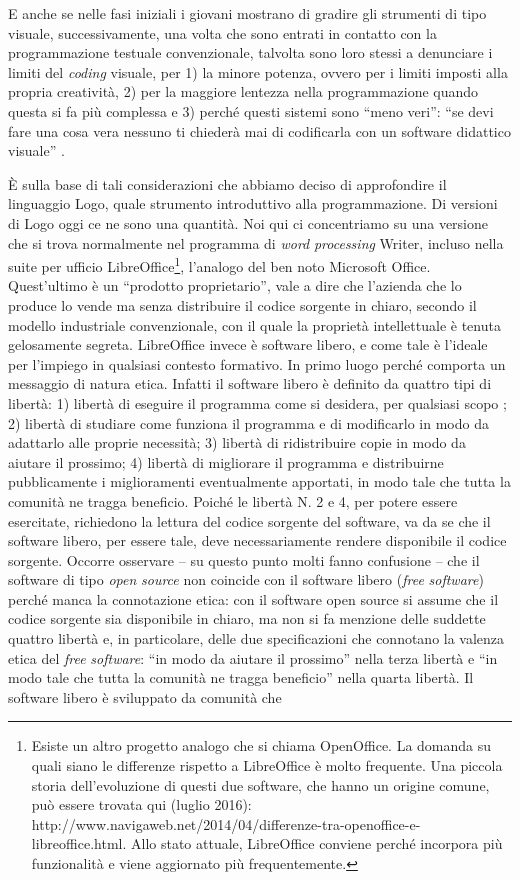 E anche se nelle fasi iniziali i giovani mostrano di gradire gli strumenti di tipo visuale, successivamente, una volta che sono entrati in contatto con la programmazione testuale convenzionale, talvolta sono loro stessi a denunciare i limiti del \textit{coding} visuale, per 1) la minore potenza, ovvero per i limiti imposti alla propria creatività, 2) per la maggiore lentezza nella programmazione quando questa si fa più complessa e 3) perché questi sistemi sono “meno veri”: “se devi fare una cosa vera nessuno ti chiederà mai di codificarla con un software didattico visuale” \cite{Weintrop3}.    

È sulla base di tali considerazioni che abbiamo deciso di approfondire il linguaggio Logo, quale strumento introduttivo alla programmazione. Di versioni di Logo oggi ce ne sono una quantità. Noi qui ci concentriamo su una versione che si trova normalmente nel programma di \textit{word} \textit{processing} Writer, incluso  nella suite per ufficio LibreOffice\footnote{Esiste un altro progetto analogo che si chiama OpenOffice. La domanda su quali siano le differenze rispetto a LibreOffice è molto frequente. Una piccola storia dell'evoluzione di questi due software, che hanno un origine comune, può essere trovata qui (luglio 2016): http://www.navigaweb.net/2014/04/differenze-tra-openoffice-e-libreoffice.html. Allo stato attuale, LibreOffice conviene perché incorpora più funzionalità e viene aggiornato più frequentemente.}, l'analogo del ben noto Microsoft Office. Quest'ultimo è un “prodotto proprietario”, vale a dire che l'azienda che lo produce lo vende ma senza distribuire il codice sorgente in chiaro, secondo il modello industriale convenzionale, con il quale la proprietà intellettuale è tenuta gelosamente segreta.  LibreOffice invece è software libero, e come tale è l'ideale per l'impiego in qualsiasi contesto formativo. In primo luogo perché comporta un messaggio di natura etica. Infatti il software libero è definito da quattro tipi di libertà: 1) libertà di eseguire il programma come si desidera, per qualsiasi scopo ; 2) libertà di studiare come funziona il programma e di modificarlo in modo da adattarlo alle proprie necessità; 3) libertà di ridistribuire copie in modo da aiutare il prossimo; 4) libertà di migliorare il programma e distribuirne pubblicamente i miglioramenti eventualmente apportati, in modo tale che tutta la comunità ne tragga beneficio. Poiché le libertà N. 2 e 4, per potere essere esercitate, richiedono la lettura del codice sorgente del software, va da se che il software libero, per essere tale, deve necessariamente rendere disponibile il codice sorgente. Occorre osservare – su questo punto molti fanno confusione – che il software di tipo \textit{open} \textit{source} non coincide con il software libero (\textit{free} \textit{software}) perché manca la connotazione etica: con il software open source si assume che il codice sorgente sia disponibile in chiaro, ma non si fa menzione delle suddette quattro libertà e, in particolare, delle due specificazioni che connotano la valenza etica del \textit{free} \textit{software}:  “in modo da aiutare il prossimo” nella terza libertà e “in modo tale che tutta la comunità ne tragga beneficio” nella quarta libertà. Il software libero è sviluppato da comunità che 